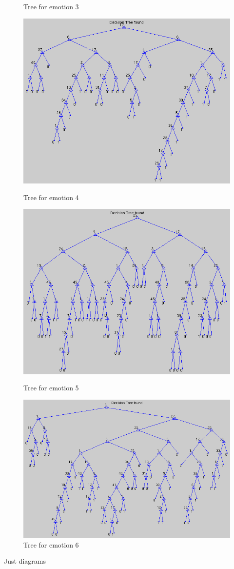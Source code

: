 \documentclass[12pt]{article}
\begin{document}
\begin{figure}[h]
  \caption{Tree for emotion 3}
\hfill
  \includegraphics{report-images/tree4.png}
  \caption{Tree for emotion 4}
\hfill
  \includegraphics{report-images/tree5.png}
  \caption{Tree for emotion 5}
\hfill
  \includegraphics{report-images/tree6.png}
  \caption{Tree for emotion 6}
\end{figure}
Just diagrams \\
\end{document}
